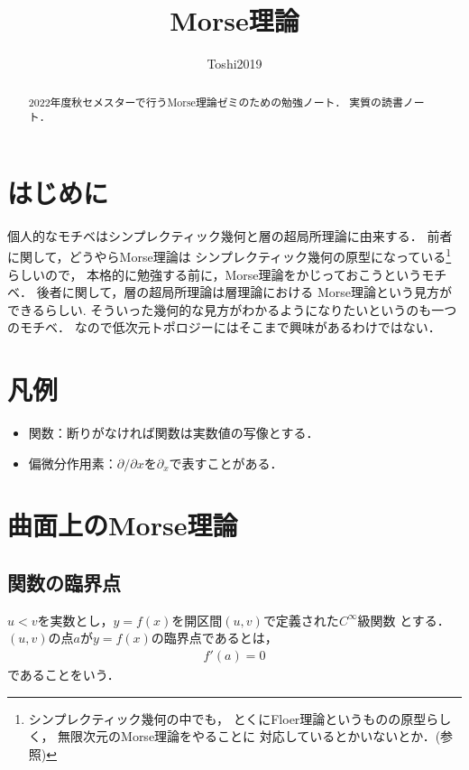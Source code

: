 \documentclass[11pt, a4paper, dvipdfmx]{jsarticle}
\theoremstyle{definition}
\newcommand{\p}{\partial}
\theoremstyle{mystyle}
\numberwithin{equation}{section} %
\begin{document}
\title{Morse理論}
\author{Toshi2019}


\maketitle
\begin{abstract}
2022年度秋セメスターで行うMorse理論ゼミのための勉強ノート．
実質\cite{M01}の読書ノート．
\end{abstract}

\section*{はじめに}
個人的なモチベはシンプレクティック幾何と層の超局所理論に由来する．
前者に関して，どうやらMorse理論は
シンプレクティック幾何の原型になっている\footnote{
    シンプレクティック幾何の中でも，
    とくにFloer理論というものの原型らしく，
    無限次元のMorse理論をやることに
    対応しているとかいないとか．(\cite{Ono06}参照)
}らしいので，
本格的に勉強する前に，Morse理論をかじっておこうというモチベ．
後者に関して，層の超局所理論は層理論における
Morse理論という見方ができるらしい\cite{Ike21}.
そういった幾何的な見方がわかるようになりたいというのも一つのモチベ．
なので低次元トポロジーにはそこまで興味があるわけではない．

\section*{凡例}
\begin{itemize}
    \item 関数：断りがなければ関数は実数値の写像とする．
    \item 偏微分作用素：$\p/{\p x}$を$\p_x$で表すことがある．
\end{itemize}

\section{曲面上のMorse理論}

\subsection{関数の臨界点}

$u<v$を実数とし，$y=f(x)$を開区間$(u,v)$で定義された$C^{\infty}$級関数
とする．$(u,v)$の点$a$が$y=f(x)$の臨界点であるとは，
\begin{align}
    f'(a)=0 \label{eq:1}
\end{align}
であることをいう．
\end{document}
